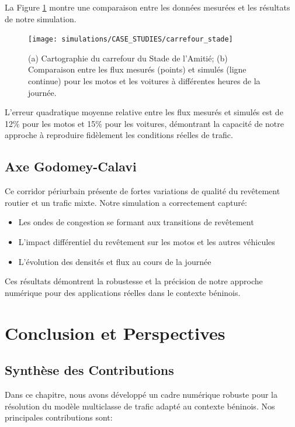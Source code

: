 La Figure \ref{fig:carrefour_stade} montre une comparaison entre les données mesurées et les résultats de notre simulation.

\begin{figure}[htbp]
\centering
\texttt{[image: simulations/CASE\_STUDIES/carrefour\_stade]}
\caption{(a) Cartographie du carrefour du Stade de l'Amitié; (b) Comparaison entre les flux mesurés (points) et simulés (ligne continue) pour les motos et les voitures à différentes heures de la journée.}
\label{fig:carrefour_stade}
\end{figure}

L'erreur quadratique moyenne relative entre les flux mesurés et simulés est de 12\% pour les motos et 15\% pour les voitures, démontrant la capacité de notre approche à reproduire fidèlement les conditions réelles de trafic.

\subsection{Axe Godomey-Calavi}
\label{subsec:axe_godomey}

Ce corridor périurbain présente de fortes variations de qualité du revêtement routier et un trafic mixte. Notre simulation a correctement capturé:

\begin{itemize}
\item Les ondes de congestion se formant aux transitions de revêtement
\item L'impact différentiel du revêtement sur les motos et les autres véhicules
\item L'évolution des densités et flux au cours de la journée
\end{itemize}

Ces résultats démontrent la robustesse et la précision de notre approche numérique pour des applications réelles dans le contexte béninois.

\section{Conclusion et Perspectives}
\label{sec:conclusion_schemas}

\subsection{Synthèse des Contributions}
\label{subsec:synthese}

Dans ce chapitre, nous avons développé un cadre numérique robuste pour la résolution du modèle multiclasse de trafic adapté au contexte béninois. Nos principales contributions sont:

